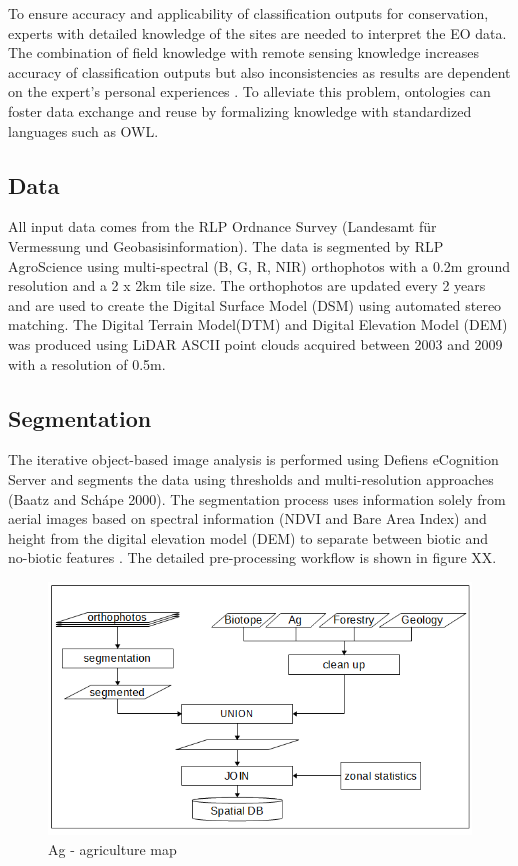 \documentclass[authoryear, review,12pt,number]{elsarticle}
\begin{document}
To ensure accuracy and applicability of classification outputs for conservation,
experts with detailed knowledge of the sites are needed to interpret the EO
data. The combination of field knowledge with remote sensing knowledge increases
accuracy of classification outputs but also inconsistencies as results are
dependent on the expert's personal experiences \citep{Andres2013a}.
To alleviate this problem, ontologies can foster data exchange and reuse by
formalizing knowledge with standardized languages such as OWL.  

\subsection{Data}
All input data comes from the RLP Ordnance Survey (Landesamt f\"ur Vermessung 
und Geobasisinformation). The data is segmented by RLP AgroScience using
multi-spectral (B, G, R, NIR) orthophotos with a 0.2m ground resolution and a
2 x 2km tile size. The orthophotos are updated every 2 years and are used to
create the Digital Surface Model (DSM) using automated stereo matching. The
Digital Terrain Model(DTM) and Digital Elevation Model (DEM) was produced using
LiDAR ASCII point clouds acquired between 2003 and 2009 with a resolution of
0.5m.\\
\subsection{Segmentation}
The iterative object-based image analysis is performed using Defiens eCognition Server
and segments the data using thresholds and multi-resolution approaches (Baatz and
Sch\'ape 2000). The segmentation process uses information solely from aerial
images based on spectral information (NDVI and Bare Area Index) and
height from the digital elevation model (DEM) to separate
between biotic and no-biotic features \citep{Tintrup2015}. 
The detailed pre-processing workflow is shown in figure XX.
\begin{figure}
	\includegraphics[width=1\textwidth]{diagrams/pre_processing.png}
	\caption{Ag - agriculture map}
\end{figure}
\end{document}
